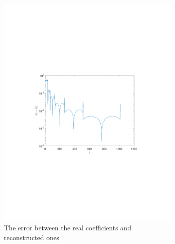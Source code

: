 \documentclass[a4paper]{article}
\begin{document}
\begin{figure}[H]
	\centering
	\begin{subfigure}{0.49\textwidth}
		\centering
		\includegraphics[trim={4cm 8cm 4cm 8cm},clip,width=1\textwidth]{Images/CoeffDelta=0.1.pdf}
		\caption{The error between the real coefficients and reconstructed ones}
		\label{sub:ErrCoeffD=0.1}
	\end{subfigure}
	\begin{subfigure}{0.49\textwidth}
		\centering

\end{subfigure}
\end{figure}
\end{document}
